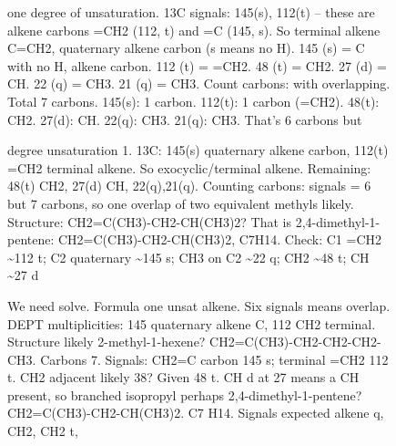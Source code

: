 \begin{figure}[t]
\noindent
\begin{reasoncol}[equal height group=reasNMR]
  \par\vspace{1pt}
  \caret{}\par\vspace{4pt}
  \raggedright{} one degree of unsaturation. 13C signals: 145(s),
  112(t) -- these are alkene carbons =CH2 (112, t) and =C (145, s). So
  terminal alkene C=CH2, quaternary alkene carbon (s means no H). 145 (s) = C
  with no H, alkene carbon. 112 (t) = =CH2. 48 (t) = CH2. 27 (d) = CH. 22 (q)
  = CH3. 21 (q) = CH3. Count carbons: with overlapping. Total 7 carbons.
  145(s): 1 carbon. 112(t): 1 carbon (=CH2). 48(t): CH2. 27(d): CH. 22(q):
  CH3. 21(q): CH3. That's 6 carbons but\par\vspace{3pt}\elide
\end{reasoncol}\hspace{\columnsep}%
\begin{reasoncol}[equal height group=reasNMR]
  \par\vspace{1pt}
  \caret{}\par\vspace{4pt}
  \raggedright{} degree unsaturation 1. 13C: 145(s) quaternary
  alkene carbon, 112(t) =CH2 terminal alkene. So exocyclic/terminal alkene.
  Remaining: 48(t) CH2, 27(d) CH, 22(q),21(q). Counting carbons: signals = 6
  but 7 carbons, so one overlap of two equivalent methyls likely. Structure:
  CH2=C(CH3)-CH2-CH(CH3)2? That is 2,4-dimethyl-1-pentene:
  CH2=C(CH3)-CH2-CH(CH3)2, C7H14. Check: C1 =CH2 \textasciitilde112 t; C2
  quaternary \textasciitilde145 s; CH3 on C2 \textasciitilde22 q; CH2
  \textasciitilde48 t; CH \textasciitilde27 d\par\vspace{3pt}\elide
\end{reasoncol}\hspace{\columnsep}%
\begin{reasoncol}[equal height group=reasNMR]
  \par\vspace{1pt}
  \caret{}\par\vspace{4pt}
  \raggedright We need solve. Formula one unsat alkene. Six signals means
  overlap. DEPT multiplicities: 145 quaternary alkene C, 112 CH2 terminal.
  Structure likely 2-methyl-1-hexene? CH2=C(CH3)-CH2-CH2-CH2-CH3. Carbons 7.
  Signals: CH2=C carbon 145 s; terminal =CH2 112 t. CH2 adjacent likely 38?
  Given 48 t. CH d at 27 means a CH present, so branched isopropyl perhaps
  2,4-dimethyl-1-pentene? CH2=C(CH3)-CH2-CH(CH3)2. C7 H14. Signals expected
  alkene q, CH2, CH2 t,\par\vspace{3pt}\elide
\end{reasoncol}


\end{figure}
